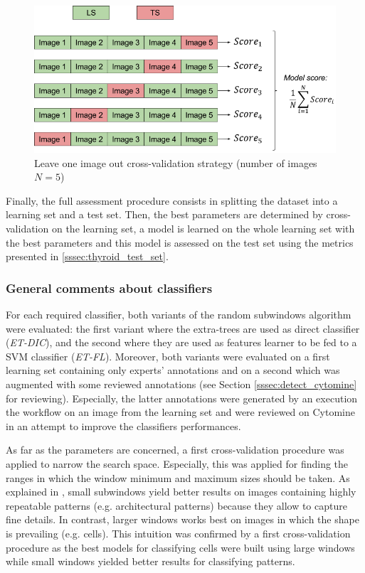 \begin{figure}
	\center
	\includegraphics[scale=0.5]{image/leave_one_image_out.png}
	\caption{Leave one image out cross-validation strategy (number of images $N = 5$)}
	\label{fig:loio}
\end{figure}

Finally, the full assessment procedure consists in splitting the dataset into a learning set and a test set. Then, the best parameters are determined by cross-validation on the learning set, a model is learned on the whole learning set with the best parameters and this model is assessed on the test set using the metrics presented in \ref{sssec:thyroid_test_set}.

\subsubsection{General comments about classifiers}
\label{sssec:general_classif}
For each required classifier, both variants of the random subwindows algorithm were evaluated: the first variant where the extra-trees are used as direct classifier (\textit{ET-DIC}), and the second where they are used as features learner to be fed to a SVM classifier (\textit{ET-FL}). Moreover, both variants were evaluated on a first learning set containing only experts' annotations and on a second which was augmented with some reviewed annotations (see Section \ref{sssec:detect_cytomine} for reviewing). Especially, the latter annotations were generated by an execution the workflow on an image from the learning set and  were reviewed on Cytomine in an attempt to improve the classifiers performances. 

As far as the parameters are concerned, a first cross-validation procedure was applied to narrow the search space. Especially, this was applied for finding the ranges in which the window minimum and maximum sizes should be taken. As explained in \cite{Maree201617}, small subwindows yield better results on images containing highly repeatable patterns (e.g. architectural patterns) because they allow to capture fine details. In contrast, larger windows works best on images in which the shape is prevailing (e.g. cells). This intuition was confirmed by a first cross-validation procedure as the best models for classifying cells were built using large windows while small windows yielded better results for classifying patterns.

